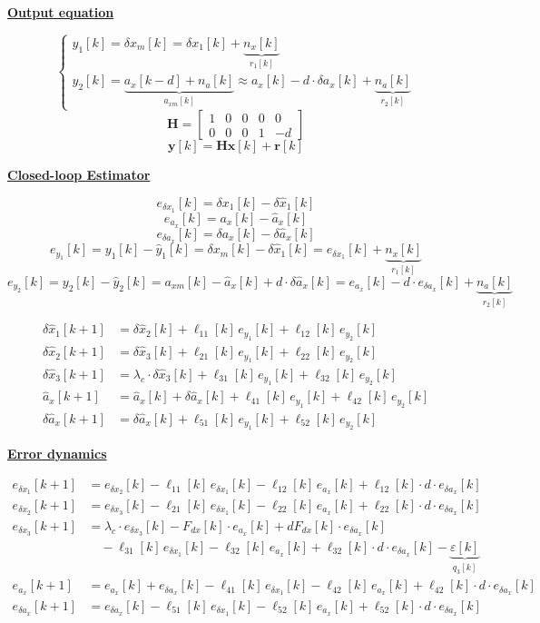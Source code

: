 \documentclass[11pt,a4paper]{ctexart}
\newcommand{\lc}{\lambda_c}
\newcommand{\hd}[1]{\par\medskip\noindent\underline{\textbf{#1}}\par\nobreak\vspace{0.2ex}}
\begin{document}
\hd{Output equation}
\[
\begin{cases}
y_1[k] = \delta x_m[k] = \delta x_1[k] + \underbrace{n_x[k]}_{r_1[k]} \\[2.0ex]
y_2[k] = \underbrace{a_x[k-d] + n_a[k]}_{a_{xm}[k]} \approx a_x[k] - d\cdot \delta a_x[k] + \underbrace{n_a[k]}_{r_2[k]}
\end{cases}
\]
\[ \mathbf{H} = \begin{bmatrix} 1 & 0 & 0 & 0 & 0 \\ 0 & 0 & 0 & 1 & -d \end{bmatrix} \]
\[ \mathbf{y}[k] = \mathbf{H}\mathbf{x}[k] + \mathbf{r}[k] \]

\hd{Closed-loop Estimator}
\[ e_{\delta x_1}[k] = \delta x_1[k] - \delta \hat x_1[k] \]
\[ e_{a_x}[k] = a_x[k] - \hat a_x[k] \]
\[ e_{\delta a_x}[k] = \delta a_x[k] - \delta \hat a_x[k] \]
\[ e_{y_1}[k] = y_1[k] - \hat y_1[k] = \delta x_m[k] - \delta \hat x_1[k] = e_{\delta x_1}[k] + \underbrace{n_x[k]}_{r_1[k]} \]
\[ e_{y_2}[k] = y_2[k] - \hat y_2[k] = a_{xm}[k] - \hat a_x[k] + d\cdot \delta \hat a_x[k] = e_{a_x}[k] - d\cdot e_{\delta a_x}[k] + \underbrace{n_a[k]}_{r_2[k]} \]

\medskip
\[
\begin{aligned}
\delta \hat x_1[k+1] &= \delta \hat x_2[k] + \ell_{11}[k]\, e_{y_1}[k] + \ell_{12}[k]\, e_{y_2}[k] \\
\delta \hat x_2[k+1] &= \delta \hat x_3[k] + \ell_{21}[k]\, e_{y_1}[k] + \ell_{22}[k]\, e_{y_2}[k] \\
\delta \hat x_3[k+1] &= \lc \cdot \delta \hat x_3[k] + \ell_{31}[k]\, e_{y_1}[k] + \ell_{32}[k]\, e_{y_2}[k] \\
\hat a_x[k+1] &= \hat a_x[k] + \delta \hat a_x[k] + \ell_{41}[k]\, e_{y_1}[k] + \ell_{42}[k]\, e_{y_2}[k] \\
\delta \hat a_x[k+1] &= \delta \hat a_x[k] + \ell_{51}[k]\, e_{y_1}[k] + \ell_{52}[k]\, e_{y_2}[k]
\end{aligned}
\]

\newpage
\hd{Error dynamics}
\[
\begin{aligned}
e_{\delta x_1}[k+1] &= e_{\delta x_2}[k] - \ell_{11}[k]\, e_{\delta x_1}[k] - \ell_{12}[k]\, e_{a_x}[k] + \ell_{12}[k]\cdot d\cdot e_{\delta a_x}[k] \\
e_{\delta x_2}[k+1] &= e_{\delta x_3}[k] - \ell_{21}[k]\, e_{\delta x_1}[k] - \ell_{22}[k]\, e_{a_x}[k] + \ell_{22}[k]\cdot d\cdot e_{\delta a_x}[k] \\
e_{\delta x_3}[k+1] &= \lc \cdot e_{\delta x_3}[k] - F_{dx}[k]\cdot e_{a_x}[k] + dF_{dx}[k]\cdot e_{\delta a_x}[k] \\
&\quad - \ell_{31}[k]\, e_{\delta x_1}[k] - \ell_{32}[k]\, e_{a_x}[k] + \ell_{32}[k]\cdot d\cdot e_{\delta a_x}[k] - \underbrace{\varepsilon[k]}_{q_3[k]} \\
e_{a_x}[k+1] &= e_{a_x}[k] + e_{\delta a_x}[k] - \ell_{41}[k]\, e_{\delta x_1}[k] - \ell_{42}[k]\, e_{a_x}[k] + \ell_{42}[k]\cdot d\cdot e_{\delta a_x}[k] \\
e_{\delta a_x}[k+1] &= e_{\delta a_x}[k] - \ell_{51}[k]\, e_{\delta x_1}[k] - \ell_{52}[k]\, e_{a_x}[k] + \ell_{52}[k]\cdot d\cdot e_{\delta a_x}[k]
\end{aligned}
\]
\end{document}

